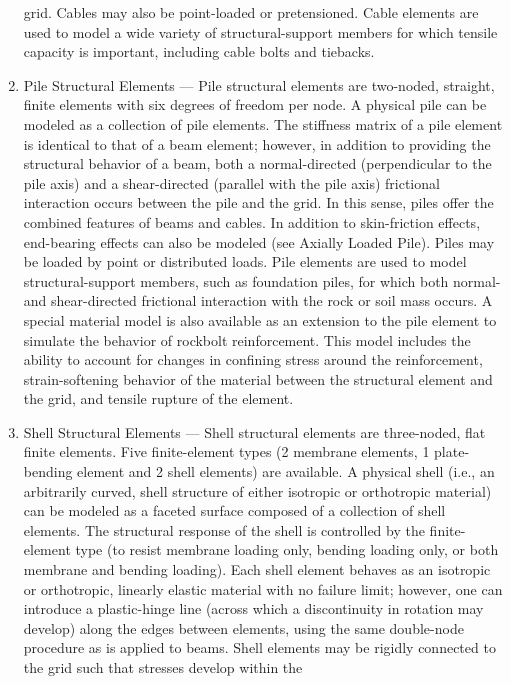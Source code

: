 \documentclass[a4paper, nobind]{templates/ociamthesis}
\begin{document}
\begin{enumerate}
  grid. Cables may also be point-loaded or pretensioned. Cable
  elements are used to model a wide variety of structural-support
  members for which tensile capacity is important, including cable
  bolts and tiebacks.
\item
  Pile Structural Elements --- Pile structural elements are two-noded,
  straight, finite elements with six degrees of freedom per node. A
  physical pile can be modeled as a collection of pile elements. The
  stiffness matrix of a pile element is identical to that of a beam
  element; however, in addition to providing the structural behavior
  of a beam, both a normal-directed (perpendicular to the pile axis)
  and a shear-directed (parallel with the pile axis) frictional
  interaction occurs between the pile and the grid. In this sense,
  piles offer the combined features of beams and cables. In addition
  to skin-friction effects, end-bearing effects can also be modeled
  (see Axially Loaded Pile). Piles may be loaded by point or
  distributed loads. Pile elements are used to model
  structural-support members, such as foundation piles, for which both
  normal- and shear-directed frictional interaction with the rock or
  soil mass occurs. A special material model is also available as an
  extension to the pile element to simulate the behavior of rockbolt
  reinforcement. This model includes the ability to account for
  changes in confining stress around the reinforcement,
  strain-softening behavior of the material between the structural
  element and the grid, and tensile rupture of the element.
\item
  Shell Structural Elements --- Shell structural elements are
  three-noded, flat finite elements. Five finite-element types (2
  membrane elements, 1 plate-bending element and 2 shell elements) are
  available. A physical shell (i.e., an arbitrarily curved, shell
  structure of either isotropic or orthotropic material) can be
  modeled as a faceted surface composed of a collection of shell
  elements. The structural response of the shell is controlled by the
  finite-element type (to resist membrane loading only, bending
  loading only, or both membrane and bending loading). Each shell
  element behaves as an isotropic or orthotropic, linearly elastic
  material with no failure limit; however, one can introduce a
  plastic-hinge line (across which a discontinuity in rotation may
  develop) along the edges between elements, using the same
  double-node procedure as is applied to beams. Shell elements may be
  rigidly connected to the grid such that stresses develop within the

\end{enumerate}
\end{document}
